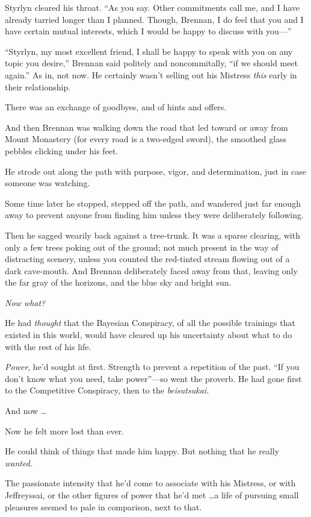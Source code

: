 {
 Styrlyn cleared his throat. ``As you say. Other
commitments call me, and I have already tarried longer than I planned.
Though, Brennan, I do feel that you and I have certain mutual
interests, which I would be happy to discuss with
you---''}

{
 ``Styrlyn, my most excellent friend, I shall be
happy to speak with you on any topic you desire,''
Brennan said politely and noncommitally, ``if we
should meet again.'' As in, not now. He certainly
wasn't selling out his Mistress \textit{this} early in
their relationship.}

{
 There was an exchange of goodbyes, and of hints and offers.}

{
 And then Brennan was walking down the road that led toward or away
from Mount Monastery (for every road is a two-edged sword), the
smoothed glass pebbles clicking under his feet.}

{
 He strode out along the path with purpose, vigor, and
determination, just in case someone was watching.}

{
 Some time later he stopped, stepped off the path, and wandered
just far enough away to prevent anyone from finding him unless they
were deliberately following.}

{
 Then he sagged wearily back against a tree-trunk. It was a sparse
clearing, with only a few trees poking out of the ground; not much
present in the way of distracting scenery, unless you counted the
red-tinted stream flowing out of a dark cave-mouth. And Brennan
deliberately faced away from that, leaving only the far gray of the
horizons, and the blue sky and bright sun.}

{
 \textit{Now what?}}

{
 He had \textit{thought} that the Bayesian Conspiracy, of all the
possible trainings that existed in this world, would have cleared up
his uncertainty about what to do with the rest of his life.}

{
 \textit{Power}, he'd sought at first. Strength to
prevent a repetition of the past. ``If you
don't know what you need, take
power''---so went the proverb. He had gone first to
the Competitive Conspiracy, then to the \textit{beisutsukai.}}

{
 And now \ldots}

{
 Now he felt more lost than ever.}

{
 He could think of things that made him happy. But nothing that he
really \textit{wanted.}}

{
 The passionate intensity that he'd come to
associate with his Mistress, or with Jeffreyssai, or the other figures
of power that he'd met \ldots a life of pursuing small
pleasures seemed to pale in comparison, next to that.}

